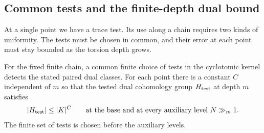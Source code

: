\subsection{Common tests and the finite-depth dual bound}

At a single point we have a trace test. Its use along a chain requires two kinds of
uniformity. The tests must be chosen in common, and their error at each point must
stay bounded as the torsion depth grows.

\begin{proposition}
\label{prop:marked-uniform-dual-tests}
For the fixed finite chain, a common finite choice of tests in the
cyclotomic kernel detects the stated paired dual classes. For each
point there is a constant \(C\) independent of \(m\) so that the tested dual cohomology group \(H_{\rm test}\) at depth \(m\) satisfies 
\[
 |H_{\rm test}|\le|K|^C\qquad\text{at the base and at every auxiliary level }N\gg_m1.
\]
 The finite set
of tests is chosen before the auxiliary levels.
\end{proposition}

